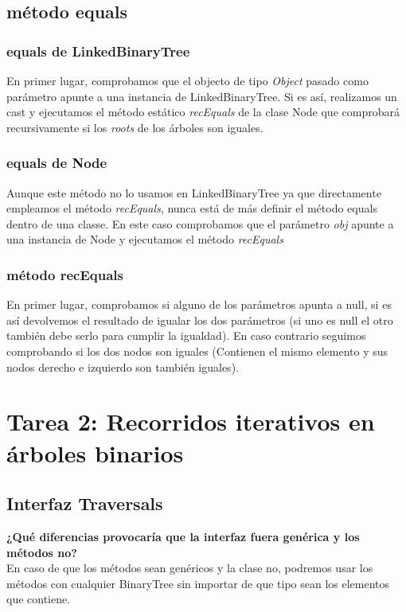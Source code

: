 \documentclass{article}
\begin{document}
    \subsection{método equals}
        \subsubsection{equals de LinkedBinaryTree}
            En primer lugar, comprobamos que el objecto de tipo \textit{Object} pasado como parámetro apunte a una instancia de LinkedBinaryTree.
            Si es así, realizamos un cast y ejecutamos el método estático \textit{recEquals} de la clase Node que comprobará recursivamente si los \textit{roots} de los árboles son iguales.
    \subsubsection{equals de Node}
            Aunque este método no lo usamos en LinkedBinaryTree ya que directamente empleamos el método \textit{recEquals}, nunca está de más definir el método equals dentro de una classe.
            En este caso comprobamos que el parámetro \textit{obj} apunte a una instancia de Node y 
            ejecutamos el método \textit{recEquals}
    \subsubsection{método recEquals}
            En primer lugar, comprobamos si alguno de los parámetros apunta a null, si es así devolvemos el resultado de igualar los dos parámetros (si uno es null el otro también debe serlo para cumplir la igualdad).
            En caso contrario seguimos comprobando si los dos nodos son iguales (Contienen el mismo elemento y sus nodos derecho e izquierdo son también iguales).
            \newline
            
\section{Tarea 2: Recorridos iterativos en árboles binarios}

    \subsection{Interfaz Traversals}
    \textbf{ ¿Qué diferencias provocaría que la interfaz fuera genérica y los
        métodos no?}\\
            En caso de que los métodos sean genéricos y la clase no, podremos usar los métodos con cualquier BinaryTree sin importar de que tipo sean los elementos que contiene.
            
\end{document}
